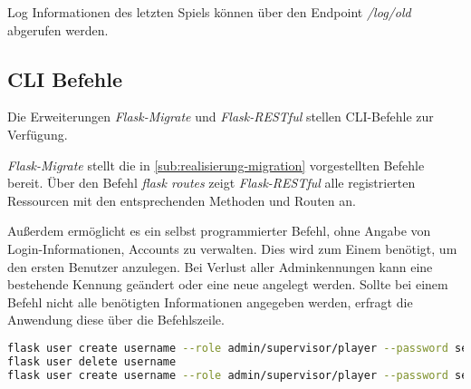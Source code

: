 Log Informationen des letzten Spiels können über den Endpoint \textit{/log/old} abgerufen werden.
	
\subsection{CLI Befehle}
Die Erweiterungen \textit{Flask-Migrate} und \textit{Flask-RESTful} stellen CLI-Befehle zur Verfügung. 


\textit{Flask-Migrate} stellt die in \autoref{sub:realisierung-migration} vorgestellten Befehle bereit. Über den Befehl \textit{flask routes} zeigt \textit{Flask-RESTful} alle registrierten Ressourcen mit den entsprechenden Methoden und Routen an.

Außerdem ermöglicht es ein selbst programmierter Befehl, ohne Angabe von \\
Login-Informationen, Accounts zu verwalten. Dies wird zum Einem benötigt, um den ersten Benutzer anzulegen. Bei Verlust aller Adminkennungen kann eine bestehende Kennung geändert oder eine neue angelegt werden. Sollte bei einem Befehl nicht alle benötigten Informationen angegeben werden, erfragt die Anwendung diese über die Befehlszeile.

\begin{lstlisting}[language=bash, frame=single, caption={GIS CLI}, captionpos=b, label={lst:gis-cli}]
flask user create username --role admin/supervisor/player --password secure_pw
flask user delete username
flask user create username --role admin/supervisor/player --password secure_pw
\end{lstlisting}